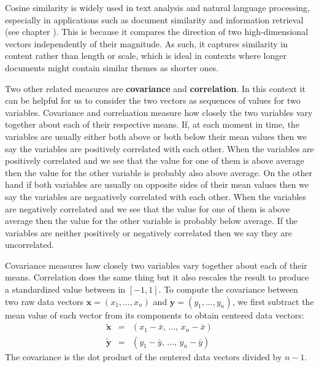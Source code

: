    Cosine similarity is widely used in text analysis and natural language 
processing, especially in applications such as document similarity and 
information retrieval (see chapter ).  This is 
because it compares the direction of two high-dimensional vectors independently
of their magnitude.  As such, it captures similarity in content rather than 
length or scale, which is ideal in contexts where longer documents might 
contain similar themes as shorter ones.

   Two other related measures are \textbf{covariance} and \textbf{correlation}.
In this context it can be helpful for us to consider the two vectors as 
sequences of values for two variables.  Covariance and correlaation measure how 
closely the two variables vary together about each of their respective means.  
If, at each moment in time, the variables are usually either both above or both 
below their mean values then we say the variables are positively correlated 
with each other.  When the variables are positively correlated and we see that
the value for one of them is above average then the value for the other 
variable is probably also above average.  On the other hand if both variables 
are usually on opposite sides of their mean values then we say the variables 
are negaatively correlated with each other.  When the variables are negatively 
correlated and we see that the value for one of them is above average then the 
value for the other variable is probably below average.  If the variables are
neither positively or negatively correlated then we say they are uncorrelated.

Covariance measures how closely two variables vary together about each of their
means.  Correlation does the same thing but it also rescales the result to 
produce a standardized value between in $[-1,1]$.  To compute the covariance 
between two raw data vectors $\mathbf{x} = (x_1, \dots, x_n)$ and $\mathbf{y} =
(y_1, \dots, y_n)$, we first subtract the mean value of each vector from 
its components to obtain centered data vectors:
\begin{eqnarray}
\tilde{\mathbf{x}} &=& (x_1 - \bar{x}, \, \dots, \, x_n - \bar{x}) 
                                                             \nonumber \\[1mm]
\tilde{\mathbf{y}} &=& (y_1 - \bar{y}, \, \dots, \, y_n - \bar{y}) 
\end{eqnarray}
The covariance is the dot product of the centered data vectors divided by
$n-1$.

